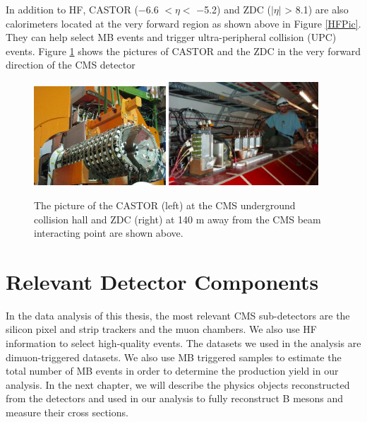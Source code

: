 In addition to HF, CASTOR ($-$6.6 $< \eta <$ $-$5.2) and ZDC ($|\eta|$ > 8.1) are also calorimeters located at the very forward region \cite{CASZDCRef} as shown above in Figure \ref{HFPic}. They can help select MB events and trigger ultra-peripheral collision (UPC) events. Figure \ref{CASTORZDC} shows the pictures of CASTOR and the ZDC in the very forward direction of the CMS detector

\begin{figure}[hbtp]
\begin{center}
\includegraphics[width=0.44\textwidth]{Figures/Chapter3/CASTOR.png}
\includegraphics[width=0.50\textwidth]{Figures/Chapter3/CMSZDC.png}
\caption{The picture of the CASTOR (left) at the CMS underground collision hall and ZDC (right) at 140 m away from the CMS beam interacting point are shown above.}
\label{CASTORZDC}
\end{center}
\end{figure} 


\section{Relevant Detector Components}

In the data analysis of this thesis, the most relevant CMS sub-detectors are the silicon pixel and strip trackers and the muon chambers. We also use HF information to select high-quality events. The datasets we used in the analysis are dimuon-triggered datasets. We also use MB triggered samples to estimate the total number of MB events in order to determine the production yield in our analysis. In the next chapter, we will describe the physics objects reconstructed from the detectors and used in our analysis to fully reconstruct B mesons and measure their cross sections.





